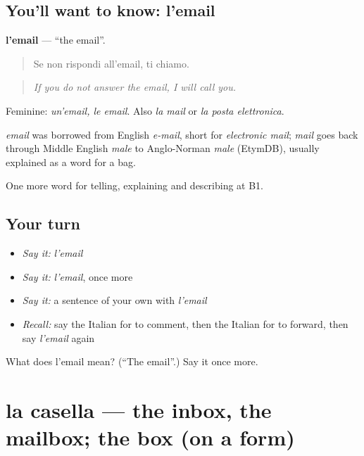 \subsection*{You'll want to know: l'email}
\textbf{l'email} — \textquotedblleft{}the email\textquotedblright{}.

\begin{quote}
Se non rispondi all'email, ti chiamo.
\end{quote}

\begin{quote}
\emph{If you do not answer the email, I will call you.}
\end{quote}

Feminine: \emph{un'email, le email}. Also \emph{la mail} or \emph{la posta elettronica}.

\begin{cousinweb}
\emph{email} was borrowed from English \emph{e-mail}, short for \emph{electronic mail}; \emph{mail} goes back through Middle English \emph{male} to Anglo-Norman \emph{male} (EtymDB), usually explained as a word for a bag.
\end{cousinweb}

\begin{grammarlens}[title={What you've built}]
One more word for telling, explaining and describing at B1.
\end{grammarlens}

\subsection*{Your turn}
\begin{itemize}
\raggedright
  \item \emph{Say it:} \emph{l'email}
  \item \emph{Say it:} \emph{l'email}, once more
  \item \emph{Say it:} a sentence of your own with \emph{l'email}
  \item \emph{Recall:} say the Italian for to comment, then the Italian for to forward, then say \emph{l'email} again
\end{itemize}

\begin{tcolorbox}[breakable,colback=teal!4,colframe=teal!35!black,title={Before you move on}]
What does l'email mean? (\textquotedblleft{}The email\textquotedblright{}.) Say it once more.
\end{tcolorbox}
\section[la casella]{la casella — the inbox, the mailbox; the box (on a form)}

